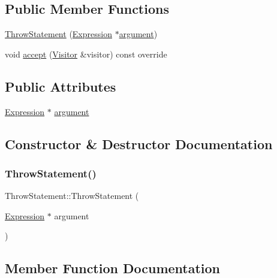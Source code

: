 \subsection*{Public Member Functions}
\begin{DoxyCompactItemize}
\item 
\hyperlink{struct_throw_statement_a63816e51d36969b20b9d58f3dbc7b3d0}{Throw\+Statement} (\hyperlink{struct_expression}{Expression} $\ast$\hyperlink{struct_throw_statement_a87b057f38ecbe03a687dec1204a7387a}{argument})
\item 
void \hyperlink{struct_throw_statement_a867eb5afd44e7a7dca0887143a42162a}{accept} (\hyperlink{struct_visitor}{Visitor} \&visitor) const override
\end{DoxyCompactItemize}
\subsection*{Public Attributes}
\begin{DoxyCompactItemize}
\item 
\hyperlink{struct_expression}{Expression} $\ast$ \hyperlink{struct_throw_statement_a87b057f38ecbe03a687dec1204a7387a}{argument}
\end{DoxyCompactItemize}


\subsection{Constructor \& Destructor Documentation}
\mbox{\label{struct_throw_statement_a63816e51d36969b20b9d58f3dbc7b3d0}} 
\subsubsection{\texorpdfstring{Throw\+Statement()}{ThrowStatement()}}
{\footnotesize\ttfamily Throw\+Statement\+::\+Throw\+Statement (\begin{DoxyParamCaption}\item[{\hyperlink{struct_expression}{Expression} $\ast$}]{argument }\end{DoxyParamCaption})\hspace{0.3cm}{\ttfamily [inline]}}



\subsection{Member Function Documentation}
\mbox{\label{struct_throw_statement_a867eb5afd44e7a7dca0887143a42162a}} 
